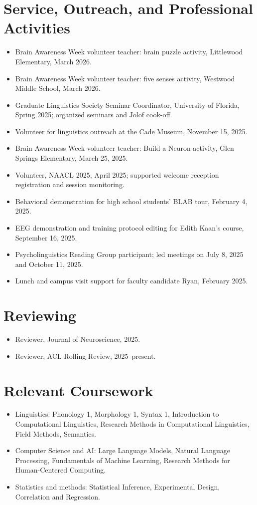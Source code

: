 \documentclass[11pt,letterpaper]{article}
\begin{document}
\section*{Service, Outreach, and Professional Activities}
\begin{itemize}
\item Brain Awareness Week volunteer teacher: brain puzzle activity, Littlewood Elementary, March 2026.
\item Brain Awareness Week volunteer teacher: five senses activity, Westwood Middle School, March 2026.
\item Graduate Linguistics Society Seminar Coordinator, University of Florida, Spring 2025; organized seminars and Jolof cook-off.
\item Volunteer for linguistics outreach at the Cade Museum, November 15, 2025.
\item Brain Awareness Week volunteer teacher: Build a Neuron activity, Glen Springs Elementary, March 25, 2025.
\item Volunteer, NAACL 2025, April 2025; supported welcome reception registration and session monitoring.
\item Behavioral demonstration for high school students' BLAB tour, February 4, 2025.
\item EEG demonstration and training protocol editing for Edith Kaan's course, September 16, 2025.
\item Psycholinguistics Reading Group participant; led meetings on July 8, 2025 and October 11, 2025.
\item Lunch and campus visit support for faculty candidate Ryan, February 2025.
\end{itemize}

\section*{Reviewing}
\begin{itemize}
\item Reviewer, Journal of Neuroscience, 2025.
\item Reviewer, ACL Rolling Review, 2025--present.
\end{itemize}

\section*{Relevant Coursework}
\begin{itemize}
\item Linguistics: Phonology 1, Morphology 1, Syntax 1, Introduction to Computational Linguistics, Research Methods in Computational Linguistics, Field Methods, Semantics.
\item Computer Science and AI: Large Language Models, Natural Language Processing, Fundamentals of Machine Learning, Research Methods for Human-Centered Computing.
\item Statistics and methods: Statistical Inference, Experimental Design, Correlation and Regression.
\end{itemize}
\end{document}
